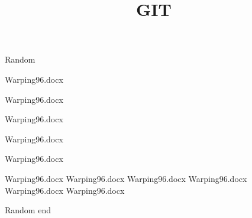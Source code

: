 \documentclass[12pt]{article}
\title{GIT}
\begin{document}
\maketitle
Random

Warping96.docx

Warping96.docx

Warping96.docx

Warping96.docx

Warping96.docx

Warping96.docx
Warping96.docx
Warping96.docx
Warping96.docx
Warping96.docx
Warping96.docx


Random end
\end{document}
